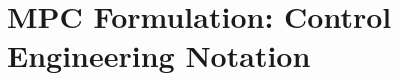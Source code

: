 \documentclass[10pt]{extarticle}
\newcommand{\lrp}[1]{\ensuremath{\left( #1 \right)}}
\begin{document}

\section{MPC Formulation: Control Engineering Notation}\label{sec:control_notation}
\end{document}

